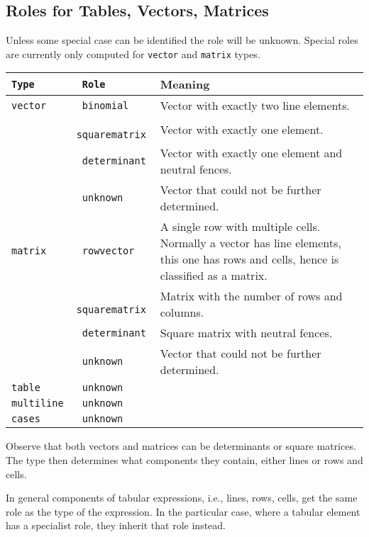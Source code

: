 \documentclass{article}
\begin{document}
\subsection{Roles for Tables, Vectors, Matrices}

Unless some special case can be identified the role will be unknown. Special
roles are currently only computed for \texttt{vector} and \texttt{matrix} types.

\begin{tabular}{>{\tt}l>{\tt}lp{11cm}}
  Type & Role & Meaning\\\hline
  vector & binomial & Vector with exactly two line elements.\\
       & squarematrix & Vector with exactly one element.\\
       & determinant & Vector with exactly one element and neutral fences.\\
       & unknown & Vector that could not be further determined.\\
  matrix & rowvector & A single row with multiple cells. Normally a vector has line elements,
                       this one has rows and cells, hence is classified as a matrix.\\
       & squarematrix & Matrix with the number of rows and columns.\\
       & determinant & Square matrix with neutral fences.\\
       & unknown & Vector that could not be further determined.\\
  table & unknown & \\
  multiline & unknown & \\
  cases & unknown & \\
\end{tabular}

Observe that both vectors and matrices can be determinants or square
matrices. The type then determines what components they contain, either lines or
rows and cells.

In general components of tabular expressions, i.e., lines, rows, cells, get the
same role as the type of the expression. In the particular case, where a tabular
element has a specialist role, they inherit that role instead.
\end{document}
